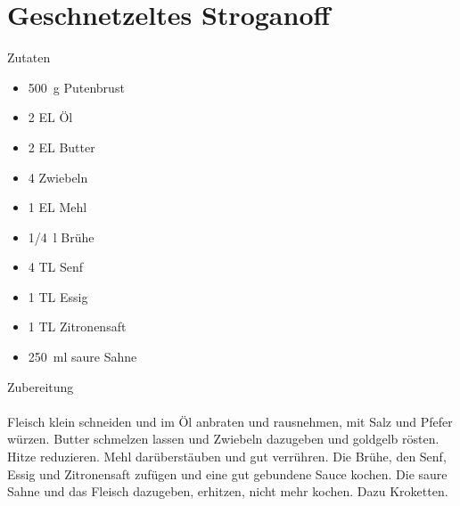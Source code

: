 \section*{Geschnetzeltes Stroganoff}
\ihead{}\ohead{}
\cfoot{}
{\Large Zutaten}
\begin{multicols}{2}
\begin{itemize}
    \item \SI{500}{g} Putenbrust
    \item \num{2} EL Öl
    \item \num{2} EL Butter
    \item \num{4} Zwiebeln
    \item \num{1} EL Mehl
    \item \SI{1/4}{l} Brühe
    \item \num{4} TL Senf
    \item \num{1} TL Essig
    \item \num{1} TL Zitronensaft
    \item \SI{250}{ml} saure Sahne 
\end{itemize}
\end{multicols}
\noindent
{\Large Zubereitung}\\
\\
Fleisch klein schneiden und im Öl anbraten und rausnehmen, mit Salz und Pfefer würzen.
Butter schmelzen lassen und Zwiebeln dazugeben und goldgelb rösten.
Hitze reduzieren.
Mehl darüberstäuben und gut verrühren.
Die Brühe, den Senf, Essig und Zitronensaft zufügen und eine gut gebundene Sauce kochen.
Die saure Sahne und das Fleisch dazugeben, erhitzen, nicht mehr kochen.
Dazu Kroketten.
